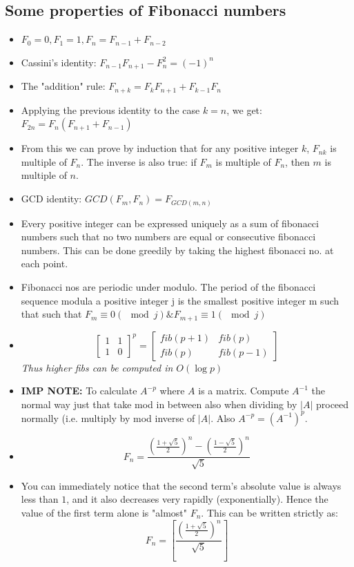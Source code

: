 \documentclass[8pt, a4paper, oneside, twocolumn]{extarticle}
\begin{document}
\subsection{Some properties of Fibonacci numbers}
\begin{itemize}
    \item $F_0 = 0, F_1 = 1, F_n = F_{n-1} + F_{n-2}$
    \item Cassini's identity: $F_{n-1} F_{n+1} - F_n^2 = (-1)^n$
    \item The "addition" rule: $F_{n+k} = F_k F_{n+1} + F_{k-1} F_n$
    \item Applying the previous identity to the case $k = n$, we get: $F_{2n} = F_n (F_{n+1} + F_{n-1})$
    \item From this we can prove by induction that for any positive integer $k$, $F_{nk}$ is multiple of $F_n$.
    The inverse is also true: if $F_m$ is multiple of $F_n$, then $m$ is multiple of $n$.
    \item GCD identity: $GCD(F_m, F_n) = F_{GCD(m, n)}$
    \item Every positive integer can be expressed uniquely as a sum of fibonacci numbers such that no two numbers are equal or consecutive fibonacci numbers. This can be done greedily by taking the highest fibonacci no. at each point.
    \item Fibonacci nos are periodic under modulo. The period of the fibonacci sequence modula a positive integer j is the smallest positive integer m such that such that $F_m \equiv 0 (\mod j) \& F_{m + 1} \equiv 1 (\mod j)$
    \item \[\begin{bmatrix}
    1 & 1\\
    1 & 0
    \end{bmatrix}^{\!p}
=
\begin{bmatrix}
    fib(p + 1) & fib (p)\\
    fib (p) & fib (p - 1)
    \end{bmatrix}
    \]
    \textit{Thus higher fibs can be computed in $O(\log{p})$}
    \item \textbf{IMP NOTE:} To calculate $A^{-p}$ where $A$ is a matrix. Compute $A^{-1}$ the normal way just that take mod in between also when dividing by $|A|$ proceed normally (i.e. multiply by mod inverse of $|A|$. Also $A^{-p} = (A^{-1})^{p}$. 
    \item $$F_n = \frac{\left(\frac{1 + \sqrt{5}}{2}\right)^n - \left(\frac{1 - \sqrt{5}}{2}\right)^n}{\sqrt{5}}$$
    \item You can immediately notice that the second term's absolute value is always less than $1$, and it also decreases very rapidly (exponentially). Hence the value of the first term alone is "almost" $F_n$. This can be written strictly as:
    $$F_n = \left[\frac{\left(\frac{1 + \sqrt{5}}{2}\right)^n}{\sqrt{5}}\right]$$
\end{itemize}
\end{document}
